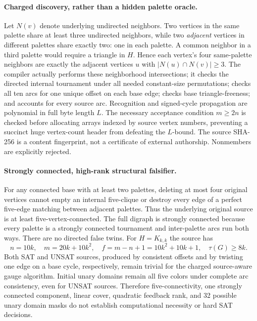 \documentclass[11pt]{article}
\begin{document}
\paragraph{Charged discovery, rather than a hidden palette oracle.}
Let $N(v)$ denote underlying undirected neighbors.
Two vertices in the same palette share at least three undirected
neighbors, while two \emph{adjacent} vertices in different palettes
share exactly two: one in each palette. A common neighbor in a third
palette would require a triangle in $H$. Hence each vertex's four
same-palette neighbors are exactly the adjacent vertices $u$ with
$|N(u)\cap N(v)|\ge3$. The compiler actually performs these
neighborhood intersections; it checks the directed internal tournament
under all needed constant-size permutations; checks all ten arcs
for one unique offset on each base edge; checks base triangle-freeness;
and accounts for every source arc. Recognition and signed-cycle
propagation are polynomial in full byte length $L$.
The necessary acceptance condition $m\ge2n$ is checked before
allocating arrays indexed by source vertex numbers, preventing
a succinct huge vertex-count header from defeating the $L$-bound.
The source SHA-256 is a content fingerprint, not a certificate of
external authorship. Nonmembers are explicitly rejected.

\paragraph{Strongly connected, high-rank structural falsifier.}
For any connected base with at least two palettes, deleting at most
four original vertices cannot empty an internal five-clique or destroy
every edge of a perfect five-edge matching between adjacent palettes.
Thus the underlying original source is at least five-vertex-connected.
The full digraph is strongly connected because every palette is a
strongly connected tournament and inter-palette arcs run both ways.
There are no directed false twins.
For $H=K_{k,k}$ the source has
\[
n=10k,\quad m=20k+10k^2,\quad
f=m-n+1=10k^2+10k+1,\quad
\tau(G)\ge8k.
\]
Both SAT and UNSAT sources, produced by consistent offsets and by
twisting one edge on a base cycle, respectively, remain trivial for
the charged source-aware gauge algorithm. Initial unary domains remain
all five colors under complete arc consistency, even for UNSAT sources.
Therefore five-connectivity, one strongly connected component,
linear cover, quadratic feedback rank, and 32 possible unary domain
masks do not establish computational necessity or hard SAT decisions.
\end{document}
